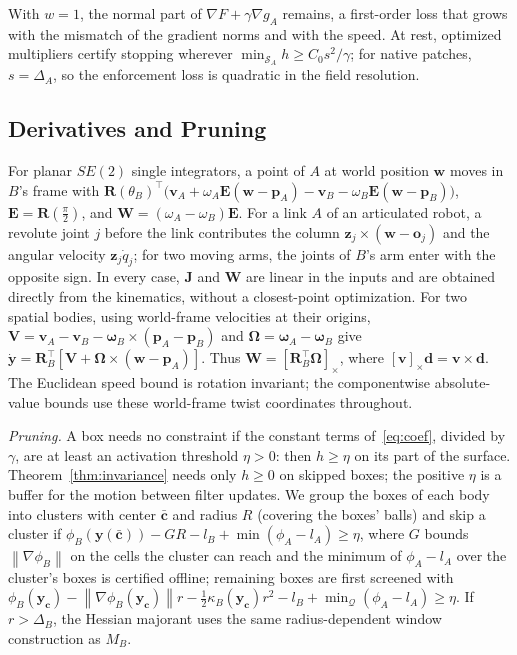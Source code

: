 \documentclass[journal]{IEEEtran}
\theoremstyle{definition}
\newcommand{\norm}[1]{\left\lVert #1\right\rVert}
\newcommand{\Rot}{\mathbf{R}}
\begin{document}
With $w=1$, the normal part of $\nabla F+\gamma\nabla g_A$ remains, a first-order loss that grows
with the mismatch of the gradient norms and with the speed. At rest, optimized multipliers certify stopping wherever
$\min_{\mathcal S_A}h\ge C_0s^2/\gamma$; for native patches, $s=\Delta_A$, so the enforcement loss is
quadratic in the field resolution.

\subsection{Derivatives and Pruning}\label{sec:cover-der}
For planar $SE(2)$ single integrators, a point of $A$ at world position $\mathbf w$ moves in $B$'s frame
with $\Rot(\theta_B)^{\!\top}\big(\mathbf v_A+\omega_A\mathbf E(\mathbf w-\mathbf p_A)-\mathbf v_B-\omega_B\mathbf E(\mathbf w-\mathbf p_B)\big)$,
$\mathbf E=\Rot(\frac\pi2)$, and
$\mathbf W=(\omega_A-\omega_B)\mathbf E$. For a link $A$ of an articulated robot, a revolute joint $j$ before
the link contributes the column $\mathbf z_j\times(\mathbf w-\mathbf o_j)$ and the angular velocity
$\mathbf z_j\dot q_j$; for two moving arms, the joints of $B$'s arm enter with the opposite sign. In
every case, $\mathbf J$ and $\mathbf W$ are linear in the inputs and are obtained directly from
the kinematics, without a closest-point optimization.
For two spatial bodies, using world-frame velocities at their origins,
$\mathbf V=\mathbf v_A-\mathbf v_B-\boldsymbol\omega_B\times(\mathbf p_A-\mathbf p_B)$ and
$\boldsymbol\Omega=\boldsymbol\omega_A-\boldsymbol\omega_B$ give
$\dot{\mathbf y}=\Rot_B^\top[\mathbf V+\boldsymbol\Omega\times(\mathbf w-\mathbf p_A)]$.
Thus $\mathbf W=[\Rot_B^\top\boldsymbol\Omega]_\times$, where $[\mathbf v]_\times\mathbf d=\mathbf v\times\mathbf d$.
The Euclidean speed bound is rotation invariant; the componentwise absolute-value bounds
use these world-frame twist coordinates throughout.

\emph{Pruning.} A box needs no constraint if the constant terms of~\eqref{eq:coef}, divided by
$\gamma$, are at least an activation threshold $\eta>0$: then $h\ge\eta$ on its part of the surface.
Theorem~\ref{thm:invariance} needs only $h\ge0$ on skipped boxes; the positive $\eta$ is a
buffer for the motion between filter updates. We group the boxes of each body into clusters with center $\bar{\mathbf c}$ and radius $R$ (covering
the boxes' balls) and skip a cluster if $\phi_B(\mathbf y(\bar{\mathbf c}))-GR-l_B+\min(\phi_A-l_A)\ge\eta$,
where $G$ bounds $\norm{\nabla\phi_B}$ on the cells the cluster can reach and the minimum of
$\phi_A-l_A$ over the cluster's boxes is certified offline; remaining boxes are first screened with
$\phi_B(\mathbf y_{\mathbf c})-\norm{\nabla\phi_B(\mathbf y_{\mathbf c})}r-\frac12\kappa_B(\mathbf y_{\mathbf c})r^2-l_B+\min_{\mathcal Q}(\phi_A-l_A)\ge\eta$.
If $r>\Delta_B$, the Hessian majorant uses the same radius-dependent window construction as $M_B$.
\end{document}
